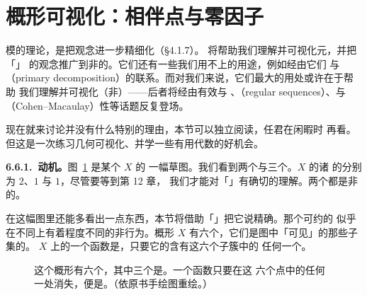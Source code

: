 
\section{概形可视化：相伴点与零因子}

模的\emph{\trAssociatedPoint}理论，是把\trSupport{}观念进一步精细化（\S4.1.7）。
\trAssociatedPoint{}将帮助我们理解并可视化\trNilpotent{}元，并把「\trRationalFunction」%
的观念推广到非\trIntegral{}的\trScheme。它们还有一些我们用不上的用途，例如经由它们
与\trPrimaryDecomposition{}（primary decomposition）的联系。而对我们来说，它们最大的用处或许在于帮助
我们理解并可视化（非）\trZerodivisor——后者将经由有效\trCartierDivisor{}与%
\trLineBundle、\trRegularSequence{}（regular sequences）、\trDepth{}与\textbf{\trCM}（Cohen--Macaulay）性等话题反复登场。

现在就来讨论\trAssociatedPoint{}并没有什么特别的理由，本节可以独立阅读，任君在闲暇时
再看。但这是一次练习几何可视化、并学一些有用代数的好机会。

\textbf{6.6.1.\ 动机。}\quad 图~\ref{fig:six-associated-points} 是某个\trScheme{} $X$ 的
一幅草图。我们看到两个\trConnectedComponent{}与三个\trIrreducibleComponent。$X$ 的诸%
\trIrreducibleComponent{}的\trDimension{}分别为 $2$、$1$ 与 $1$，尽管要等到第 12 章，
我们才能对「\trDimension」有确切的理解。两个\trConnectedComponent{}都是非\trReduced{}的。

在这幅图里还能多看出一点东西，本节将借助「\trAssociatedPoint」把它说精确。那个可约的%
\trConnectedComponent{}似乎在不同\trLocus{}上有着程度不同的非\trReduced{}行为。概形 $X$
有六个\trAssociatedPoint，它们是图中「可见」的那些\trIrreducible{}子集的\trGenericPoint。%
$X$ 上的一个函数是\trZerodivisor，只要它的\trZeroSet{}含有这六个\trIrreducible{}子簇中的
任何一个。

\begin{figure}[htbp]
\centering
{}
\caption{这个概形有六个\trAssociatedPoint，其中三个是\trEmbeddedPoint。一个函数只要在这
六个点中的任何一处消失，便是\trZerodivisor。（依原书手绘图重绘。）}%
\label{fig:six-associated-points}
\end{figure}

